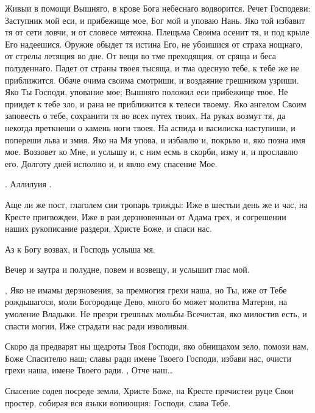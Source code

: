 \begin{mymulticols}


Живыи в помощи Вышняго, в крове Бога небеснаго водворится. Речет Господеви: Заступник мой еси, и прибежище мое, Бог мой и уповаю Нань. Яко той избавит тя от сети ловчи, и от словесе мятежна. Плещьма Своима осенит тя, и под крыле Его надеешися. Оружие обыдет тя истина Его, не убоишися от страха нощнаго, от стрелы летящия во дне. От вещи во тме преходящия, от сряща и беса полуденнаго. Падет от страны твоея тысяща, и тма одесную тебе, к тебе же не приближится. Обаче очима своима смотриши, и воздаяние грешником узриши. Яко Ты Господи, упование мое; Вышняго положил еси прибежище твое. Не приидет к тебе зло, и рана не приближится к телеси твоему. Яко ангелом Своим заповесть о тебе, сохранити тя во всех путех твоих. На руках возмут тя, да некогда преткнеши о камень ноги твоея. На аспида и василиска наступиши, и попереши льва и змия. Яко на Мя упова, и избавлю и, покрыю и, яко позна имя мое. Воззовет ко Мне, и услышу и, с ним есмь в скорби, изму и, и прославлю его. Долготу дней исполню и, и явлю ему спасение Мое. 

. Аллилуия .



Аще ли же пост, глаголем сии тропарь трижды: Иже в шестыи день же и час, на Кресте пригвождеи, Иже в раи дерзновенныи от Адама грех, и согрешении наших рукописание раздери, Христе Боже, и спаси нас.

 Аз к Богу возвах, и Господь услыша мя.

 Вечер и заутра и полудне, повем и возвещу, и услышит глас мой.

,  Яко не имамы дерзновения, за премногия грехи наша, но Ты, иже от Тебе рождьшагося, моли Богородице Дево, много бо может молитва Матерня, на умоление Владыки. Не презри грешных мольбы Всечистая, яко милостив есть, и спасти могии, Иже страдати нас ради изволивыи. 

 Скоро да предварят ны щедроты Твоя Господи, яко обнищахом зело, помози нам, Боже Спасителю наш; славы ради имене Твоего Господи, избави нас, очисти грехи наша, имене Твоего ради. ,  Отче наш… 

 Спасение содея посреде земли, Христе Боже, на Кресте пречистеи руце Свои простер, собирая вся языки вопиющия: Господи, слава Тебе. 


\end{mymulticols}
